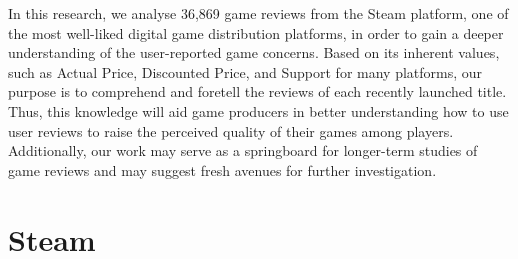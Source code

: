 \documentclass[runningheads]{llncs}
\begin{document}
In this research, we analyse 36,869 game reviews from the Steam platform, one of the most well-liked digital game distribution platforms, in order to gain a deeper understanding of the user-reported game concerns. Based on its inherent values, such as Actual Price, Discounted Price, and Support for many platforms, our purpose is to comprehend and foretell the reviews of each recently launched title. Thus, this knowledge will aid game producers in better understanding how to use user reviews to raise the perceived quality of their games among players. Additionally, our work may serve as a springboard for longer-term studies of game reviews and may suggest fresh avenues for further investigation.
\section{Steam}
\end{document}
